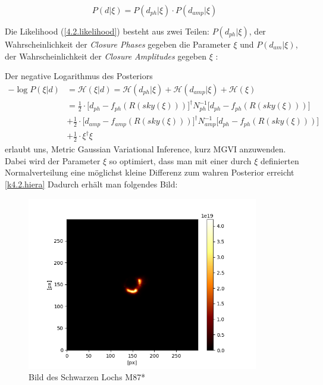 \begin{equation}
P(d|\xi)=  {P(d_{ph}|\xi)\cdot P(d_{amp}|\xi)}    
\end{equation}

Die Likelihood (\cref{4.2.likelihood}) besteht aus zwei Teilen: $P(d_{ph}|\xi)$, der Wahrscheinlichkeit der \emph{Closure Phases} gegeben die Parameter $\xi$ und $P(d_{am}| \xi)$, der Wahrscheinlichkeit der \emph{Closure Amplitudes} gegeben $\xi$ : 

Der negative Logarithmus des Posteriors
\begin{align} \label{k4.2.Posterior}
 -\log {P(\xi|d)} &= 
 \mathcal{H} (\xi|d) = \mathcal{H} (d_{ph}|\xi)+\mathcal{H} (d_{amp}|\xi)+\mathcal{H} (\xi) \\
&= \frac {1}{2}\cdot \Bigg[d_{ph} - f_{ph}(R(sky(\xi))) \Bigg]^\dagger N^{-1}_{ph} \Bigg[d_{ph} - f_{ph}(R(sky(\xi))) \Bigg] 
\\  & + \frac {1}{2}\cdot \Bigg[d_{amp} - f_{amp}(R(sky(\xi))) \Bigg]^\dagger N_{amp}^{-1}\Bigg[d_{ph} - f_{ph}(R(sky(\xi))) \Bigg] \nonumber
\\ & +  \frac {1}{2} \cdot \xi^\dagger \xi \nonumber  
\end{align} 
 erlaubt uns, Metric Gaussian Variational Inference, kurz MGVI \parencite{k4.2.mgvi} anzuwenden. Dabei wird der Parameter $\xi$ so optimiert, dass man mit einer durch $\xi$ definierten Normalverteilung eine möglichst kleine Differenz zum wahren Posterior erreicht \cref{k4.2.hiera}
Dadurch erhält man folgendes Bild:

\begin{figure}
    \centering
    \includegraphics[width = 0.9\textwidth]{k4.2/black-hole-lin.png}
    \caption{Bild des Schwarzen Lochs M87*}
    \label{k4.2.black-hole-lin}
\end{figure}

